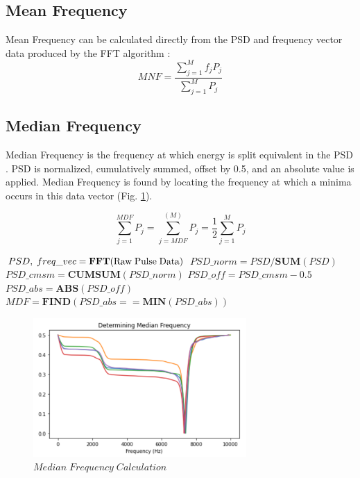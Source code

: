 \documentclass[conference]{IEEEtran}
\begin{document}
\subsection{Mean Frequency}
Mean Frequency can be calculated directly from the PSD and frequency vector data produced by the FFT algorithm \cite{angkoon2012}:
\begin{equation*}
    MNF = \frac{ \sum_{j=1}^M f_j P_j }{ \sum_{j=1}^M P_j }
\end{equation*}

\subsection{Median Frequency}
Median Frequency is the frequency at which energy is split equivalent in the PSD \cite{angkoon2012}. PSD is normalized, cumulatively summed, offset by 0.5, and an absolute value is applied.  Median Frequency is found by locating the frequency at which a minima occurs in this data vector (Fig. \ref{fig:MDF}).

\begin{equation*}
    \sum_{j=1}^{MDF} P_j = \sum_{j=MDF}^(M) P_j = \frac{1}{2} \sum_{j=1}^{M} P_j
\end{equation*}

\medbreak
\begin{algorithmic}
\STATE $PSD,\;freq\_vec = \textbf{FFT}(\text{Raw\;Pulse\;Data})$
\STATE $PSD\_norm = PSD / \textbf{SUM}(PSD)$
\STATE $PSD\_cmsm = \textbf{CUMSUM}(PSD\_norm)$
\STATE $PSD\_off = PSD\_cmsm - 0.5$
\STATE $PSD\_abs = \textbf{ABS}(PSD\_off)$
\STATE $MDF = \textbf{FIND}( PSD\_abs == \textbf{MIN}(PSD\_abs) )$
\end{algorithmic}

\begin{figure}[htb]
\centering
\includegraphics[width=3.2in]{figures/57_mdf.png}
\caption{$Median\;Frequency\;Calculation$}
\label{fig:MDF}
\end{figure}
\end{document}
